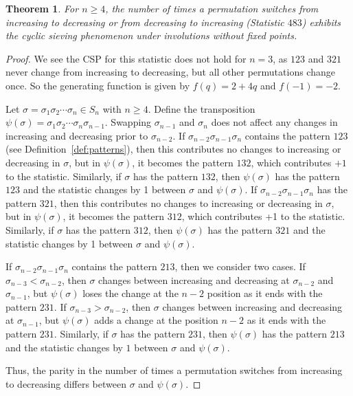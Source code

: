 \documentclass{amsart}
\newtheorem{thm}{Theorem}[section]
\theoremstyle{definition}
\begin{document}
\begin{thm}\label{inc_dec}
  For $n \geq 4$, the number of times a permutation switches from increasing to decreasing or from decreasing to increasing (Statistic $483$) exhibits the cyclic sieving phenomenon under involutions without fixed points.
\end{thm}

\begin{proof}
  We see the CSP for this statistic does not hold for $n = 3$, as $1 2 3$ and $3 2 1$ never change from increasing to decreasing, but all other permutations change once. So the generating function is given by $f(q) = 2 + 4q$ and $f(-1) = -2$.

  Let $\sigma = \sigma_1\sigma_2 \dotsm \sigma_n\in S_n$ with $n \geq 4$. Define the transposition $\psi(\sigma) = \sigma_1\sigma_2 \dotsm \sigma_n \sigma_{n-1}$. Swapping $\sigma_{n-1}$ and $\sigma_{n}$ does not affect any changes in increasing and decreasing prior to $\sigma_{n-2}$. If $\sigma_{n-2}\sigma_{n-1}\sigma_n$ contains the pattern $123$ (see Definition~\ref{def:patterns}), then this contributes no changes to increasing or decreasing in $\sigma$, but in $\psi(\sigma)$, it becomes the pattern $132$, which contributes $+1$ to the statistic. Similarly, if $\sigma$ has the pattern $132$, then $\psi(\sigma)$ has the pattern $123$ and the statistic changes by 1 between $\sigma$ and $\psi(\sigma)$. If $\sigma_{n-2}\sigma_{n-1}\sigma_n$ has the pattern $321$, then this contributes no changes to increasing or decreasing in $\sigma$, but in $\psi(\sigma)$, it becomes the pattern $312$, which contributes +1 to the statistic. Similarly, if $\sigma$ has the pattern $312$, then $\psi(\sigma)$ has the pattern $321$ and the statistic changes by 1 between $\sigma$ and $\psi(\sigma)$.

  If $\sigma_{n-2}\sigma_{n-1}\sigma_n$ contains the pattern $213$, then we consider two cases. If $\sigma_{n-3} < \sigma_{n-2}$, then $\sigma$ changes between increasing and decreasing at $\sigma_{n-2}$ and $\sigma_{n-1}$, but $\psi(\sigma)$ loses the change at the $n-2$ position as it ends with the pattern $231$. If $\sigma_{n-3} > \sigma_{n-2}$, then $\sigma$ changes between increasing and decreasing at $\sigma_{n-1}$, but $\psi(\sigma)$ adds a change at the position $n-2$ as it ends with the pattern $231$. Similarly, if $\sigma$ has the pattern $231$, then $\psi(\sigma)$ has the pattern $213$ and the statistic changes by $1$ between $\sigma$ and $\psi(\sigma)$.

  Thus, the parity in the number of times a permutation switches from increasing to decreasing differs between $\sigma$ and $\psi(\sigma)$.
\end{proof}
\end{document}
